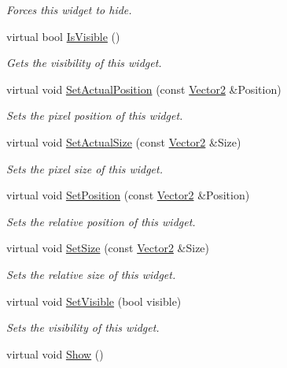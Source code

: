 \begin{DoxyCompactItemize}
\begin{DoxyCompactList}\small\item\em Forces this widget to hide. \item\end{DoxyCompactList}\item 
virtual bool \hyperlink{classphys_1_1UI_1_1DropDownList_ae4bd94c8f891dadf2423cef16c28e3f9}{IsVisible} ()
\begin{DoxyCompactList}\small\item\em Gets the visibility of this widget. \item\end{DoxyCompactList}\item 
virtual void \hyperlink{classphys_1_1UI_1_1DropDownList_af4d36a88b9629284d22d023bdcfd4074}{SetActualPosition} (const \hyperlink{classphys_1_1Vector2}{Vector2} \&Position)
\begin{DoxyCompactList}\small\item\em Sets the pixel position of this widget. \item\end{DoxyCompactList}\item 
virtual void \hyperlink{classphys_1_1UI_1_1DropDownList_ad85c38f98f467565f2b895993ab92f96}{SetActualSize} (const \hyperlink{classphys_1_1Vector2}{Vector2} \&Size)
\begin{DoxyCompactList}\small\item\em Sets the pixel size of this widget. \item\end{DoxyCompactList}\item 
virtual void \hyperlink{classphys_1_1UI_1_1DropDownList_a91dbfd382be8c505021739602a7a64e6}{SetPosition} (const \hyperlink{classphys_1_1Vector2}{Vector2} \&Position)
\begin{DoxyCompactList}\small\item\em Sets the relative position of this widget. \item\end{DoxyCompactList}\item 
virtual void \hyperlink{classphys_1_1UI_1_1DropDownList_aebcb4fe708e7d1af4609120039e276a6}{SetSize} (const \hyperlink{classphys_1_1Vector2}{Vector2} \&Size)
\begin{DoxyCompactList}\small\item\em Sets the relative size of this widget. \item\end{DoxyCompactList}\item 
virtual void \hyperlink{classphys_1_1UI_1_1DropDownList_ac86730fe238d990505667bb9a475fb77}{SetVisible} (bool visible)
\begin{DoxyCompactList}\small\item\em Sets the visibility of this widget. \item\end{DoxyCompactList}\item 
\hypertarget{classphys_1_1UI_1_1DropDownList_aa30bdfe138516a0f51efa2034cd9f595}{
virtual void \hyperlink{classphys_1_1UI_1_1DropDownList_aa30bdfe138516a0f51efa2034cd9f595}{Show} ()}
\label{classphys_1_1UI_1_1DropDownList_aa30bdfe138516a0f51efa2034cd9f595}


\end{DoxyCompactItemize}
